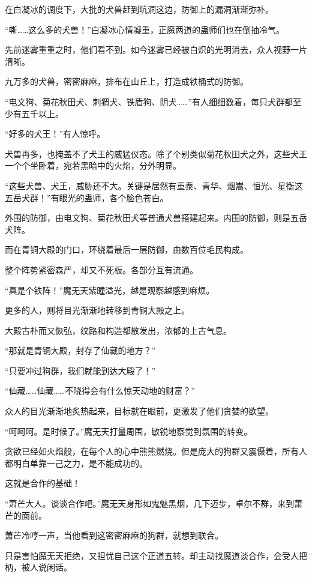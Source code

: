 \begin{this_body}
在白凝冰的调度下，大批的犬兽赶到坑洞这边，防御上的漏洞渐渐弥补。

“嘶……这么多的犬兽！”白凝冰心情凝重，正魔两道的蛊师们也在倒抽冷气。

先前迷雾重重之时，他们看不到。如今迷雾已经被白炽的光明消去，众人视野一片清晰。

九万多的犬兽，密密麻麻，排布在山丘上，打造成铁桶式的防御。

“电文狗、菊花秋田犬、刺猬犬、铁盾狗、阴犬……”有人细细数着，每只犬群都至少有五千以上。

“好多的犬王！”有人惊呼。

犬兽再多，也掩盖不了犬王的威猛仪态。除了个别类似菊花秋田犬之外，这些犬王一个个坐卧着，宛若黑暗中的火焰，分外明显。

“这些犬兽、犬王，威胁还不大。关键是居然有重泰、青华、烟嵩、恒光、星衡这五岳犬群！”有眼光的蛊师，各个脸色苍白。

外围的防御，由电文狗、菊花秋田犬等普通犬兽搭建起来。内围的防御，则是五岳犬阵。

而在青铜大殿的门口，环绕着最后一层防御，由数百位毛民构成。

整个阵势紧密森严，却又不死板。各部分互有流通。

“真是个铁阵！”魔无天紫瞳溢光，越是观察越感到麻烦。

更多的人，则将目光渐渐地转移到青铜大殿之上。

大殿古朴而又恢弘，纹路和构造都散发出，浓郁的上古气息。

“那就是青铜大殿，封存了仙藏的地方？”

“只要冲过狗群，我们就能到达大殿了！”

“仙藏……仙藏……不晓得会有什么惊天动地的财富？”

众人的目光渐渐地炙热起来，目标就在眼前，更激发了他们贪婪的欲望。

“呵呵呵。是时候了。”魔无天打量周围，敏锐地察觉到氛围的转变。

贪欲已经如火焰般，在每个人的心中熊熊燃烧。但是庞大的狗群又震慑着，所有人都明白单靠一己之力，是不能成功的。

这就是合作的基础！

“萧芒大人。谈谈合作吧。”魔无天身形如鬼魅黑烟，几下迈步，卓尔不群，来到萧芒的面前。

萧芒冷哼一声，当他看到这密密麻麻的狗群，就想到联合。

只是害怕魔无天拒绝，又担忧自己这个正道五转。却主动找魔道谈合作，会受人把柄，被人说闲话。


\end{this_body}
